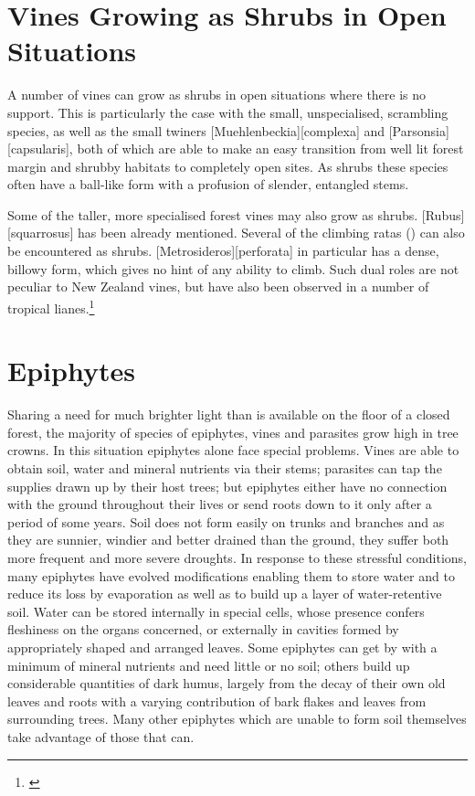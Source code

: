 \section{Vines Growing as Shrubs in Open Situations}

A number of vines can grow as shrubs in open situations where there is no support.
This is particularly the case with the small, unspecialised, scrambling species, as well as the small twiners [Muehlenbeckia][complexa] and [Parsonsia][capsularis], both of which are able to make an easy transition from well lit forest margin and shrubby habitats to completely open sites.
As shrubs these species often have a ball-like form with a profusion of slender, entangled stems.

Some of the taller, more specialised forest vines may also grow as shrubs. [Rubus][squarrosus] has been already mentioned.
Several of the climbing ratas () can also be encountered as shrubs. [Metrosideros][perforata] in particular has a dense, billowy form, which gives no hint of any ability to climb.
Such dual roles are not peculiar to New Zealand vines, but have also been observed in a number of tropical lianes.\footnote{\cite{richards1952tropical}}

\section{Epiphytes}

Sharing a need for much brighter light than is available on the floor of a closed forest, the majority of species of epiphytes, vines and parasites grow high in tree crowns.
In this situation epiphytes alone face special problems.
Vines are able to obtain soil, water and mineral nutrients via their stems; parasites can tap the supplies drawn up by their host trees; but epiphytes either have no connection with the ground throughout their lives or send roots down to it only after a period of some years.
Soil does not form easily on trunks and branches and as they are sunnier, windier and better drained than the ground, they suffer both more frequent and more severe droughts.
In response to these stressful conditions, many epiphytes have evolved modifications enabling them to store water and to reduce its loss by evaporation as well as to build up a layer of water-retentive soil.
Water can be stored internally in special cells, whose presence confers fleshiness on the organs concerned, or externally in cavities formed by appropriately shaped and arranged leaves.
Some epiphytes can get by with a minimum of mineral nutrients and need little or no soil; others build up considerable quantities of dark humus, largely from the decay of their own old leaves and roots with a varying contribution of bark flakes and leaves from surrounding trees.
Many other epiphytes which are unable to form soil themselves take advantage of those that can.

